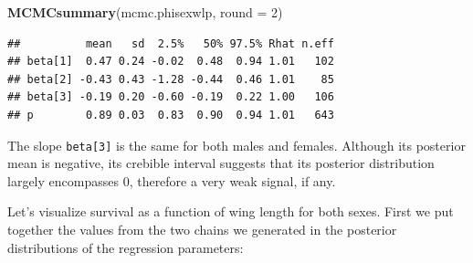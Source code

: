 \documentclass[
  12pt,
]{krantz}
\newenvironment{Shaded}{\begin{snugshade}}{\end{snugshade}}
\newcommand{\AttributeTok}[1]{\textcolor[rgb]{0.13,0.29,0.53}{#1}}
\newcommand{\CommentTok}[1]{\textcolor[rgb]{0.56,0.35,0.01}{\textit{#1}}}
\newcommand{\DecValTok}[1]{\textcolor[rgb]{0.00,0.00,0.81}{#1}}
\newcommand{\FunctionTok}[1]{\textcolor[rgb]{0.13,0.29,0.53}{\textbf{#1}}}
\newcommand{\NormalTok}[1]{#1}
\newcommand{\OtherTok}[1]{\textcolor[rgb]{0.56,0.35,0.01}{#1}}
\newcommand{\SpecialCharTok}[1]{\textcolor[rgb]{0.81,0.36,0.00}{\textbf{#1}}}
\newcommand{\StringTok}[1]{\textcolor[rgb]{0.31,0.60,0.02}{#1}}
\begin{document}
\begin{Shaded}
\begin{Highlighting}[]
\FunctionTok{MCMCsummary}\NormalTok{(mcmc.phisexwlp, }\AttributeTok{round =} \DecValTok{2}\NormalTok{)}
\end{Highlighting}
\end{Shaded}

\begin{verbatim}
##          mean   sd  2.5%   50% 97.5% Rhat n.eff
## beta[1]  0.47 0.24 -0.02  0.48  0.94 1.01   102
## beta[2] -0.43 0.43 -1.28 -0.44  0.46 1.01    85
## beta[3] -0.19 0.20 -0.60 -0.19  0.22 1.00   106
## p        0.89 0.03  0.83  0.90  0.94 1.01   643
\end{verbatim}

The slope \texttt{beta{[}3{]}} is the same for both males and females. Although its posterior mean is negative, its crebible interval suggests that its posterior distribution largely encompasses 0, therefore a very weak signal, if any.

Let's visualize survival as a function of wing length for both sexes. First we put together the values from the two chains we generated in the posterior distributions of the regression parameters:

\begin{Shaded}
\end{Shaded}
\end{document}

